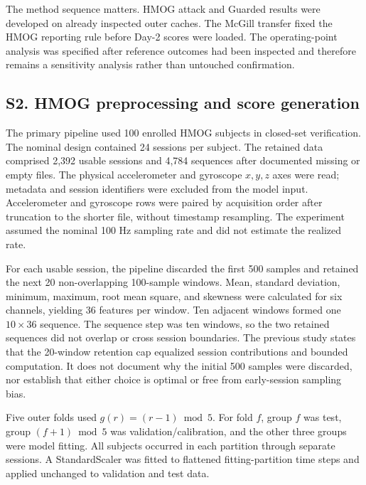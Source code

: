 \documentclass[technologies,supfile,submit,moreauthors]{Definitions/mdpi}
\begin{document}
The method sequence matters. HMOG attack and Guarded results were developed on already inspected outer caches. The McGill transfer fixed the HMOG reporting rule before Day-2 scores were loaded. The operating-point analysis was specified after reference outcomes had been inspected and therefore remains a sensitivity analysis rather than untouched confirmation.

\subsection*{S2. HMOG preprocessing and score generation}\label{sm:s2}

The primary pipeline used 100 enrolled HMOG subjects in closed-set verification. The nominal design contained 24 sessions per subject. The retained data comprised 2,392 usable sessions and 4,784 sequences after documented missing or empty files. The physical accelerometer and gyroscope \(x,y,z\) axes were read; metadata and session identifiers were excluded from the model input. Accelerometer and gyroscope rows were paired by acquisition order after truncation to the shorter file, without timestamp resampling. The experiment assumed the nominal 100 Hz sampling rate and did not estimate the realized rate.

For each usable session, the pipeline discarded the first 500 samples and retained the next 20 non-overlapping 100-sample windows. Mean, standard deviation, minimum, maximum, root mean square, and skewness were calculated for six channels, yielding 36 features per window. Ten adjacent windows formed one \(10\times36\) sequence. The sequence step was ten windows, so the two retained sequences did not overlap or cross session boundaries. The previous study states that the 20-window retention cap equalized session contributions and bounded computation. It does not document why the initial 500 samples were discarded, nor establish that either choice is optimal or free from early-session sampling bias.

Five outer folds used \(g(r)=(r-1)\bmod5\). For fold \(f\), group \(f\) was test, group \((f+1)\bmod5\) was validation/calibration, and the other three groups were model fitting. All subjects occurred in each partition through separate sessions. A StandardScaler was fitted to flattened fitting-partition time steps and applied unchanged to validation and test data.
\end{document}
